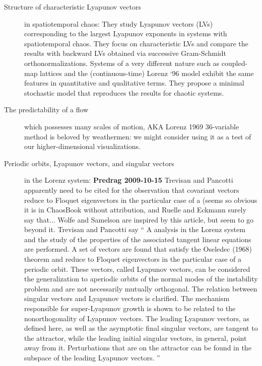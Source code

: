 \begin{description}
\item[Structure of characteristic {L}yapunov vectors]
in spatiotemporal chaos:
They study Lyapunov vectors (LVs) corresponding to
the largest Lyapunov exponents in systems with spatiotemporal
chaos. They focus on characteristic LVs and compare the results
with backward LVs obtained via successive Gram-Schmidt
orthonormalizations. Systems of a very different nature such
as coupled-map lattices and the (continuous-time) Lorenz `96
model exhibit the same features in quantitative and
qualitative terms. They propose a minimal
stochastic model that reproduces the results for chaotic
systems.

\item[The predictability of a flow] which possesses
                many scales of motion,
AKA Lorenz 1969 36-variable method is beloved by weathermen:
we might consider using it as a test of our higher-dimensional
visualizations.

\item[Periodic orbits, Lyapunov vectors, and singular
    vectors] in the Lorenz system:
{\bf Predrag 2009-10-15} Trevisan and Pancotti apparently
need to be cited for the observation that covariant vectors
reduce to Floquet eigenvectors in the particular case of a
{\po} (seems so obvious it is in ChaosBook without
attribution, and Ruelle and Eckmann surely say
that... Wolfe and Samelson are inspired by this
article, but seem to go beyond it. Trevisan and Pancotti say
``
A {\po} analysis in the Lorenz system
and the study of the properties of the associated tangent
linear equations are performed.
			                                \inCB
A set of vectors are found
that satisfy the Oseledec (1968) theorem and reduce to
Floquet eigenvectors in the particular case of a periodic
orbit. These vectors, called Lyapunov vectors, can be
considered the generalization to aperiodic orbits of the
normal modes of the instability problem and are not
necessarily mutually orthogonal. The relation between
singular vectors and Lyapunov vectors is clarified. The
mechanism responsible for super-Lyapunov growth is shown to
be related to the nonorthogonality of Lyapunov vectors. The
leading Lyapunov vectors, as defined here, as well as the
asymptotic final singular vectors, are tangent to the
attractor, while the leading initial singular vectors, in
general, point away from it. Perturbations that are on the
attractor can be found in the subspace of the leading
Lyapunov vectors.
    ''


\end{description}
